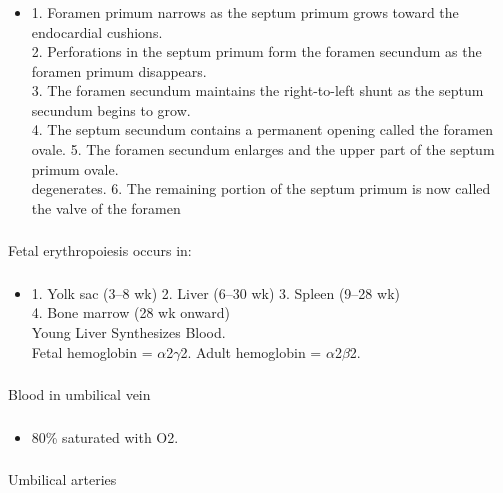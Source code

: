 \documentclass[11pt]{beamer}
\begin{document}
\begin{frame}
 \frametitle{}
\begin{itemize}
\item{1. Foramen primum narrows as the septum primum grows toward the endocardial cushions. \\ 2. Perforations in the septum primum form the foramen secundum as the foramen primum disappears. \\ 3. The foramen secundum maintains the right-to-left shunt as the septum secundum begins to grow. \\ 4. The septum secundum contains a permanent opening called the foramen ovale. 5. The foramen secundum enlarges and the upper part of the septum primum ovale.  \\ degenerates. 6. The remaining portion of the septum primum is now called the valve of the foramen}
\end{itemize}
\end{frame}

\begin{frame}
 \frametitle{}
Fetal erythropoiesis occurs in:
\end{frame}

\begin{frame}
 \frametitle{}
\begin{itemize}
\item{1. Yolk sac (3–8 wk) 2. Liver (6–30 wk) 3. Spleen (9–28 wk) \\ 4. Bone marrow (28 wk onward) \\ Young Liver Synthesizes Blood. \\ Fetal hemoglobin = ${\alpha}$2${\gamma}$2. Adult hemoglobin = ${\alpha}$2${\beta}$2.}
\end{itemize}
\end{frame}

\begin{frame}
 \frametitle{}
Blood in umbilical vein
\end{frame}

\begin{frame}
 \frametitle{}
\begin{itemize}
\item{ 80\% saturated with O2.}
\end{itemize}
\end{frame}

\begin{frame}
 \frametitle{}
Umbilical arteries
\end{frame}
\end{document}
